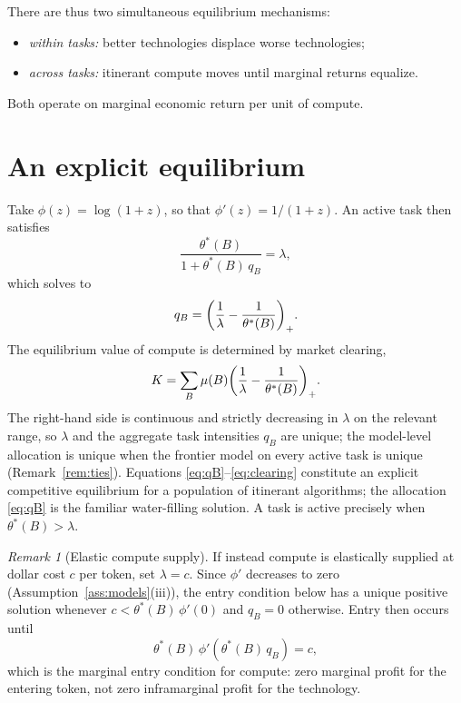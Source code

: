 \documentclass[11pt]{article}
\theoremstyle{definition}
\theoremstyle{remark}
\newtheorem{remark}{Remark}
\DeclarePairedDelimiter{\pos}{(}{)_{+}}
\begin{document}
There are thus two simultaneous equilibrium mechanisms:
\begin{itemize}[itemsep=2pt]
\item \emph{within tasks:} better technologies displace worse technologies;
\item \emph{across tasks:} itinerant compute moves until marginal returns equalize.
\end{itemize}
Both operate on marginal economic return per unit of compute.

\section{An explicit equilibrium}
\label{sec:explicit}

Take $\phi(z) = \log(1+z)$, so that $\phi'(z) = 1/(1+z)$. An active task then satisfies
\begin{equation}
\frac{\theta^*(B)}{1 + \theta^*(B)\, q_B} = \lambda,
\end{equation}
which solves to
\begin{equation}
\label{eq:qB}
q_B = \pos*{ \frac{1}{\lambda} - \frac{1}{\theta^*(B)} }.
\end{equation}
The equilibrium value of compute is determined by market clearing,
\begin{equation}
\label{eq:clearing}
K = \sum_B \mu(B) \pos*{ \frac{1}{\lambda} - \frac{1}{\theta^*(B)} }.
\end{equation}
The right-hand side is continuous and strictly decreasing in $\lambda$ on the relevant range, so $\lambda$ and the aggregate task intensities $q_B$ are unique; the model-level allocation is unique when the frontier model on every active task is unique (Remark~\ref{rem:ties}). Equations \eqref{eq:qB}--\eqref{eq:clearing} constitute an explicit competitive equilibrium for a population of itinerant algorithms; the allocation \eqref{eq:qB} is the familiar water-filling solution. A task is active precisely when $\theta^*(B) > \lambda$.

\begin{remark}[Elastic compute supply]
If instead compute is elastically supplied at dollar cost $c$ per token, set $\lambda = c$. Since $\phi'$ decreases to zero (Assumption~\ref{ass:models}(iii)), the entry condition below has a unique positive solution whenever $c < \theta^*(B)\,\phi'(0)$ and $q_B = 0$ otherwise. Entry then occurs until
\begin{equation}
\theta^*(B)\, \phi'\!\left( \theta^*(B)\, q_B \right) = c,
\end{equation}
which is the marginal entry condition for compute: zero marginal profit for the entering token, not zero inframarginal profit for the technology.
\end{remark}
\end{document}
